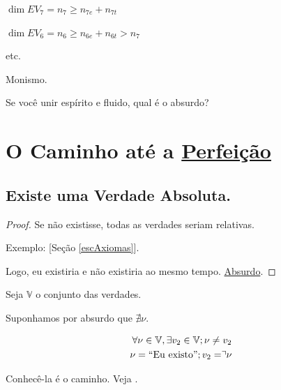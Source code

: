 \documentclass[12pt,a4paper]{article}
\begin{document}
			$\dim EV_7 = n_7 \ge n_{7e} + n_{7t}$

			$\dim EV_6 = n_6 \ge n_{6e} + n_{6t} > n_7$

			etc.

			Monismo.

			Se voc\^e unir esp\'irito e fluido, qual \'e o absurdo?

	\section{O Caminho at\'e a \href{http://sites.google.com/site/mathspirituality/portugues/RefinandoaPerfei\%C3\%A7\%C3\%A3o.ASF?attredirects=0}{Perfei\c{c}\~ao}}\label{caminho}
			\begin{flushright}
			\end{flushright}

		\subsection{Existe uma Verdade Absoluta.}\label{verdade}
			\begin{flushright}
			\end{flushright}

			\begin{proof}
				Se n\~ao existisse, todas as verdades seriam relativas.

				Exemplo: [Se\c{c}\~ao \ref{escAxiomas}].

				Logo, eu existiria e n\~ao existiria ao mesmo tempo\cite{tempo}. \href{http://en.wikipedia.org/wiki/Proof\_by\_contradiction}{Absurdo}.
			\end{proof}

			Seja $\mathbb{V}$ o conjunto das verdades.

			Suponhamos por absurdo que $ \nexists \nu $.

			\begin{align*}
				\forall \nu \in \mathbb{V}, \exists v_2 \in \mathbb{V} ; \nu \neq v_2 \\
				\nu = \mbox{\textquotedblleft Eu existo\textquotedblright}; v_2 = \urcorner \nu
			\end{align*}

			\begin{center}
			\end{center}

			Conhec\^e-la \'e o caminho. Veja \cite{verdade}.
\end{document}
